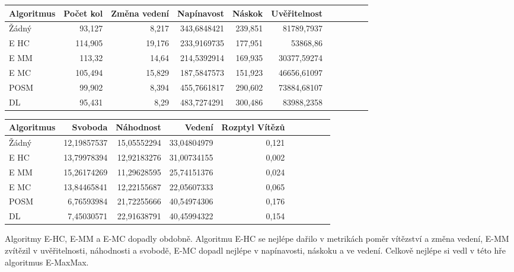 \begin{table*}[b]\footnotesize
\vspace*{0mm}
\caption{{\label{tab-mazem}} Porovnání metrik zábavnosti u jednotlivých algoritmů ve hře Bludiště. Metriky změna vedení a svoboda se maximalizují, zbytek minimalizuje.}
\vspace*{0mm}
\label{shadowtable}
\begin{center}
\begin{tabular}{| l || r | r | r | r | r | r | r | r | r | r |}
\hline
Algoritmus & Počet kol	& Změna vedení & Napínavost & Náskok & Uvěřitelnost\\
\hline
\hline
Žádný & 93,127 & 8,217 & 343,6848421 & 239,851 & 81789,7937 \\ \hline  
E HC & 114,905 & 19,176 & 233,9169735 & 177,951 & 53868,86 \\ \hline
E MM & 113,32 & 14,64 & 214,5392914 & 169,935 & 30377,59274 \\ \hline
E MC & 105,494 & 15,829 & 187,5847573 & 151,923 & 46656,61097 \\ \hline
POSM & 99,902 & 8,394 & 455,7661817 & 290,602 & 73884,68107 \\ \hline
DL & 95,431 & 8,29 & 483,7274291 & 300,486 & 83988,2358 \\ \hline
\end{tabular}
\end{center}
\begin{center}
\begin{tabular}{| l || r | r | r | r | r | r | r | r | r |}
\hline
Algoritmus & Svoboda & Náhodnost & Vedení &	Rozptyl Vítězů \\
\hline
\hline
Žádný & 12,19857537 & 15,05552294 & 33,04804979 & 0,121 \\ \hline  
E HC & 13,79978394 & 12,92183276 & 31,00734155 & 0,002 \\ \hline
E MM & 15,26174269 & 11,29628595 & 25,74151376 & 0,024 \\ \hline
E MC & 13,84465841 & 12,22155687 & 22,05607333 & 0,065 \\ \hline
POSM & 6,76593984 & 21,72255666 & 40,54974306 & 0,176 \\ \hline
DL & 7,45030571 & 22,91638791 & 40,45994322 & 0,154 \\ \hline
\end{tabular}
\end{center}
\end{table*}

Algoritmy E-HC, E-MM a E-MC dopadly obdobně. Algoritmu E-HC se nejlépe dařilo v metrikách poměr vítězství a změna vedení, E-MM zvítězil v uvěřitelnosti, náhodnosti a svobodě, E-MC dopadl nejlépe v napínavosti, náskoku a ve vedení. Celkově nejlépe si vedl v této hře algoritmus E-MaxMax.

